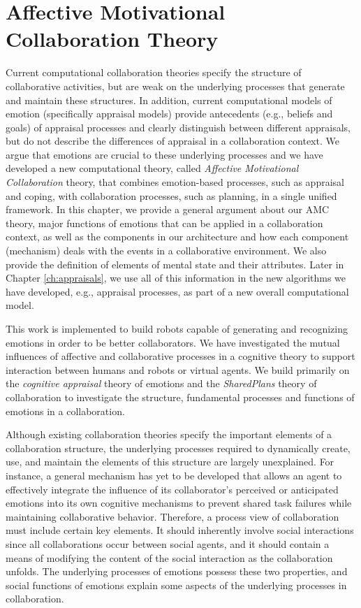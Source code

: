 \documentclass[12pt]{report}
\begin{document}
\chapter{Affective Motivational Collaboration Theory}
\label{ch:amct}
\vspace*{-5mm}
Current computational collaboration theories specify the structure of
collaborative activities, but are weak on the underlying processes that generate
and maintain these structures. In addition, current computational
models of emotion (specifically appraisal models) provide antecedents (e.g.,
beliefs and goals) of appraisal processes and clearly distinguish between
different appraisals, but do not describe the differences of appraisal in a
collaboration context. We argue that emotions are crucial to these underlying
processes and we have developed a new computational theory, called
\textit{Affective Motivational Collaboration} theory, that combines
emotion-based processes, such as appraisal and coping, with collaboration
processes, such as planning, in a single unified framework. In this
chapter, we provide a general argument about our AMC theory, major functions of
emotions that can be applied in a collaboration context, as well as the
components in our architecture and how each component (mechanism) deals with the events in
a collaborative environment. We also provide the definition of elements of
mental state and their attributes. Later in Chapter \ref{ch:appraisals}, we use
all of this information in the new algorithms we have developed, e.g.,
appraisal processes, as part of a new overall computational model.

This work is implemented to build robots capable of generating and recognizing
emotions in order to be better collaborators. We have investigated the mutual
influences of affective and collaborative processes in a cognitive theory to
support interaction between humans and robots or virtual agents. We build
primarily on the \textit{cognitive appraisal} theory of emotions and the
\textit{SharedPlans} theory of collaboration to investigate the structure,
fundamental processes and functions of emotions in a collaboration.

Although existing collaboration theories specify the important elements of a
collaboration structure, the underlying processes required to dynamically
create, use, and maintain the elements of this structure are largely
unexplained. For instance, a general mechanism has yet to be developed that
allows an agent to effectively integrate the influence of its collaborator's
perceived or anticipated emotions into its own cognitive mechanisms to prevent
shared task failures while maintaining collaborative behavior. Therefore, a
process view of collaboration must include certain key elements. It should
inherently involve social interactions since all collaborations occur between
social agents, and it should contain a means of modifying the content of the
social interaction as the collaboration unfolds. The underlying processes of
emotions possess these two properties, and social functions of emotions explain
some aspects of the underlying processes in collaboration.
\end{document}
